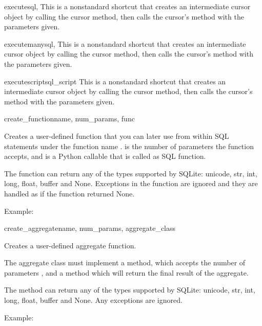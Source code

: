 \begin{methoddesc}{execute}{sql, }
This is a nonstandard shortcut that creates an intermediate cursor object by
calling the cursor method, then calls the cursor's  method with the
parameters given.
\end{methoddesc}

\begin{methoddesc}{executemany}{sql, }
This is a nonstandard shortcut that creates an intermediate cursor object by
calling the cursor method, then calls the cursor's  method with the
parameters given.
\end{methoddesc}

\begin{methoddesc}{executescript}{sql_script}
This is a nonstandard shortcut that creates an intermediate cursor object by
calling the cursor method, then calls the cursor's  method with the
parameters given.
\end{methoddesc}

\begin{methoddesc}{create_function}{name, num_params, func}

Creates a user-defined function that you can later use from within SQL
statements under the function name .  is the number
of parameters the function accepts, and  is a Python callable that is
called as SQL function.

The function can return any of the types supported by SQLite: unicode, str,
int, long, float, buffer and None.  Exceptions in the function are ignored and
they are handled as if the function returned None.

Example:

  
\end{methoddesc}

\begin{methoddesc}{create_aggregate}{name, num_params, aggregate_class}

Creates a user-defined aggregate function.

The aggregate class must implement a  method, which accepts the
number of parameters , and a  method which
will return the final result of the aggregate.

The  method can return any of the types supported by SQLite:
unicode, str, int, long, float, buffer and None. Any exceptions are ignored.

Example:

  
\end{methoddesc}


